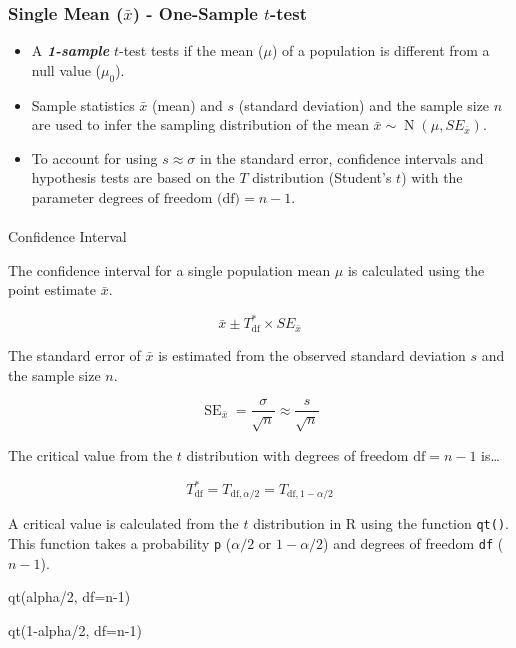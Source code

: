 \documentclass[
  letterpaper,
  DIV=11,
  numbers=noendperiod]{scrartcl}
\makeatletter
\let\oldparagraph\paragraph
\renewcommand{\paragraph}{
    \@ifstar
      \xxxParagraphStar
      \xxxParagraphNoStar
  }
\newcommand{\xxxParagraphStar}[1]{\oldparagraph*{#1}\mbox{}}
\newcommand{\xxxParagraphNoStar}[1]{\oldparagraph{#1}\mbox{}}
\newenvironment{Shaded}{\begin{snugshade}}{\end{snugshade}}
\newcommand{\AttributeTok}[1]{\textcolor[rgb]{0.40,0.45,0.13}{#1}}
\newcommand{\DecValTok}[1]{\textcolor[rgb]{0.68,0.00,0.00}{#1}}
\newcommand{\FunctionTok}[1]{\textcolor[rgb]{0.28,0.35,0.67}{#1}}
\newcommand{\NormalTok}[1]{\textcolor[rgb]{0.00,0.23,0.31}{#1}}
\newcommand{\SpecialCharTok}[1]{\textcolor[rgb]{0.37,0.37,0.37}{#1}}
\makeatother
\begin{document}
\subsubsection{\texorpdfstring{Single Mean (\(\bar{x}\)) - One-Sample
\(t\)-test}{Single Mean (\textbackslash bar\{x\}) - One-Sample t-test}}\label{single-mean-barx---one-sample-t-test}

\begin{itemize}
\item
  A \textbf{\emph{1-sample}} \(t\)-test tests if the mean (\(\mu\)) of a
  population is different from a null value (\(\mu_0\)).
\item
  Sample statistics \(\bar{x}\) (mean) and \(s\) (standard deviation)
  and the sample size \(n\) are used to infer the sampling distribution
  of the mean
  \(\bar{x} \sim \operatorname{N}\left(\mu, SE_{\bar{x}}\right)\).
\item
  To account for using \(s \approx \sigma\) in the standard error,
  confidence intervals and hypothesis tests are based on the \(T\)
  distribution (Student's \(t\)) with the parameter
  \(\text{degrees of freedom (df)}=n-1\).
\end{itemize}

\paragraph{Confidence Interval}\label{confidence-interval}

The confidence interval for a single population mean \(\mu\) is
calculated using the point estimate \(\bar{x}\).

\[
\bar{x} \pm T_{\text{df}}^* \times SE_{\bar{x}}
\]

The standard error of \(\bar{x}\) is estimated from the observed
standard deviation \(s\) and the sample size \(n\).

\[
\operatorname{SE}_{\bar{x}}=\frac{\sigma}{\sqrt{n}}\approx\frac{s}{\sqrt{n}}
\]

The critical value from the \(t\) distribution with degrees of freedom
\(\text{df}=n-1\) is\ldots{}

\[
T_{\text{df}}^*=T_{\text{df},\alpha/2}=T_{\text{df}, 1-\alpha/2}
\]

A critical value is calculated from the \(t\) distribution in R using
the function \texttt{qt()}. This function takes a probability \texttt{p}
(\(\alpha/2\) or \(1-\alpha/2\)) and degrees of freedom \texttt{df}
(\(n-1\)).

\begin{Shaded}
\begin{Highlighting}[]
\FunctionTok{qt}\NormalTok{(alpha}\SpecialCharTok{/}\DecValTok{2}\NormalTok{, }\AttributeTok{df=}\NormalTok{n}\DecValTok{{-}1}\NormalTok{)}

\FunctionTok{qt}\NormalTok{(}\DecValTok{1}\SpecialCharTok{{-}}\NormalTok{alpha}\SpecialCharTok{/}\DecValTok{2}\NormalTok{, }\AttributeTok{df=}\NormalTok{n}\DecValTok{{-}1}\NormalTok{)}
\end{Highlighting}
\end{Shaded}
\end{document}
